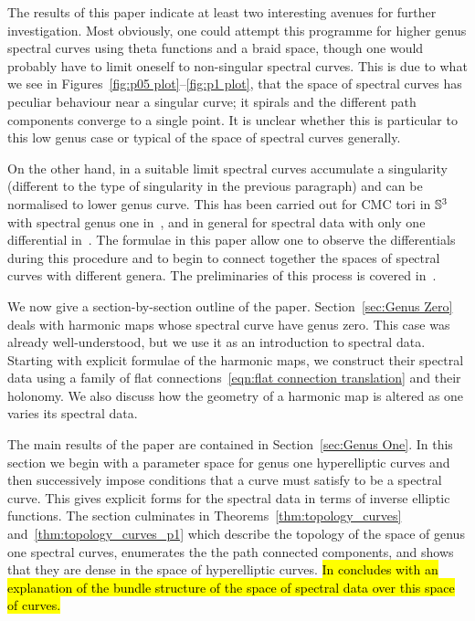 \documentclass{article}
\begin{document}
The results of this paper indicate at least two interesting avenues for further investigation. Most obviously, one could attempt this programme for higher genus spectral curves using theta functions and a braid space, though one would probably have to limit oneself to non-singular spectral curves. This is due to what we see in Figures~\ref{fig:p05 plot}--\ref{fig:p1 plot}, that the space of spectral curves has peculiar behaviour near a singular curve; it spirals and the different path components converge to a single point. It is unclear whether this is particular to this low genus case or typical of the space of spectral curves generally.

On the other hand, in a suitable limit spectral curves accumulate a singularity (different to the type of singularity in the previous paragraph) and can be normalised to lower genus curve. This has been carried out for CMC tori in $\S^3$ with spectral genus one in~\cite{Kilian2015}, and in general for spectral data with only one differential in~\cite{Hauswirth2017arxiv}. The formulae in this paper allow one to observe the differentials during this procedure and to begin to connect together the spaces of spectral curves with different genera. The preliminaries of this process is covered in~\cite[Section~4.2]{Ogilvie2017}. 

We now give a section-by-section outline of the paper. Section~\ref{sec:Genus Zero} deals with harmonic maps whose spectral curve have genus zero. This case was already well-understood, but we use it as an introduction to spectral data. Starting with explicit formulae of the harmonic maps, we construct their spectral data using a family of flat connections~\eqref{eqn:flat connection translation} and their holonomy.
We also discuss how the geometry of a harmonic map is altered as one varies its spectral data.

The main results of the paper are contained in Section~\ref{sec:Genus One}. In this section we begin with a parameter space for genus one hyperelliptic curves and then successively impose conditions that a curve must satisfy to be a spectral curve. This gives explicit forms for the spectral data in terms of inverse elliptic functions.
The section culminates in Theorems~\ref{thm:topology_curves} and~\ref{thm:topology_curves_p1} which describe the topology of the space of genus one spectral curves, enumerates the the path connected components, and shows that they are dense in the space of hyperelliptic curves. \hl{In concludes with an explanation of the bundle structure of the space of spectral data over this space of curves.}
\end{document}
